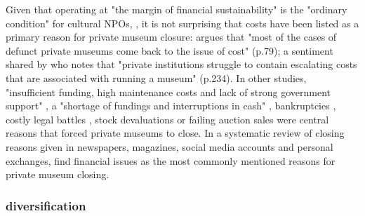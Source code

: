 \documentclass[12pt]{article}
\begin{document}
Given that operating at "the margin of financial sustainability" is the "ordinary condition" for cultural NPOs, \parencite[p.2]{Licci_BaraldiBonini_2024_sustainability}, it is not surprising that costs have been listed as a primary reason for private museum closure:
\textcite{Adam_2021_rise} argues that "most of the cases of defunct private museums come back to the issue of cost" (p.79); a sentiment shared by \textcite{Walker_2019_collector} who notes that "private institutions struggle to contain escalating costs that are associated with running a museum" (p.234).
In other studies, "insufficient funding, high maintenance costs and lack of strong government support" \parencite[p.7]{Zennaro_2017_shanghai}, a "shortage of fundings and interruptions in cash" \parencite[p.45]{Song_2008_private}, bankruptcies \parencite{Velthuis_Gera_2024_fragility,Liu_2019_identities,DeNigris_2018_museums}, costly legal battles \parencite{Velthuis_Gera_2024_fragility}, stock devaluations \parencite{Walker_2019_collector} or failing auction sales \parencite{Bechtler_Imhof_2018_future} were central reasons that forced private museums to close.
In a systematic review of closing reasons given in newspapers, magazines, social media accounts and personal exchanges, \textcite{Velthuis_Gera_2024_fragility} find financial issues as the most commonly mentioned reasons for private museum closing.
\subsubsection*{diversification}
\end{document}
